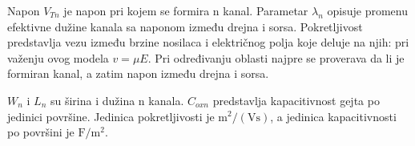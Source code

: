 Napon $V_{Tn}$ je napon pri kojem se formira n kanal. Parametar $\lambda_n$ opisuje promenu efektivne dužine kanala sa naponom između drejna i sorsa. Pokretljivost predstavlja vezu između brzine nosilaca i električnog polja koje deluje na njih: pri važenju ovog modela $v=\mu E$. Pri određivanju oblasti najpre se proverava da li je formiran kanal, a zatim napon između drejna i sorsa.

$W_n$ i $L_n$ su širina i dužina n kanala. $C_{oxn}$ predstavlja kapacitivnost gejta po jedinici površine. Jedinica pokretljivosti je $\mathrm{m^2/(Vs)}$, a jedinica kapacitivnosti po površini je $\mathrm{F/m^2}$.
